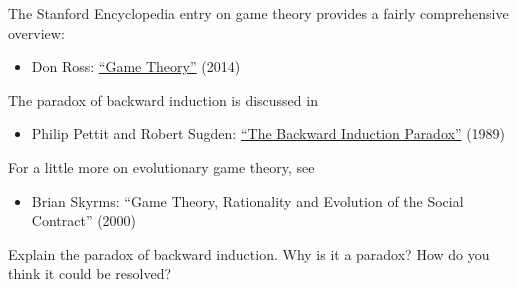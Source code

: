 The Stanford Encyclopedia entry on game theory provides a fairly comprehensive overview:

\begin{itemize}
\item Don Ross: \href{https://plato.stanford.edu/entries/game-theory/}{``Game Theory''} (2014)
\end{itemize}

The paradox of backward induction is discussed in
\begin{itemize}
\item Philip Pettit and Robert Sugden: \href{https://www.princeton.edu/~ppettit/papers/BackwardInduction_JournalofPhilosophy_1989.pdf}{``The Backward Induction Paradox''} (1989)
\end{itemize}

For a little more on evolutionary game theory, see

\begin{itemize}
\item Brian Skyrms: ``Game Theory, Rationality and Evolution of the Social Contract'' (2000) 
\end{itemize}

\begin{essay}
  Explain the paradox of backward induction. Why is it a paradox? How
  do you think it could be resolved?
\end{essay}


